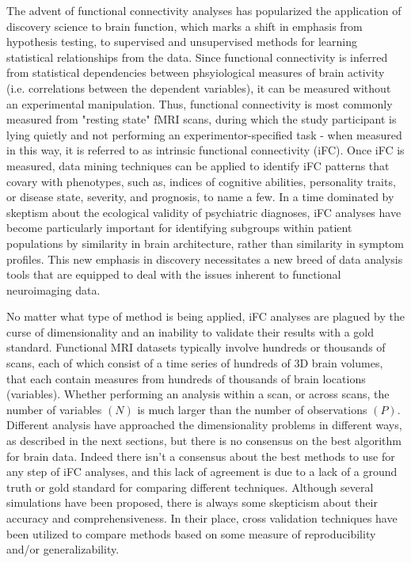 The advent of functional connectivity analyses has popularized the application of discovery science to brain function, which marks a shift in emphasis from hypothesis testing, to supervised and unsupervised methods for learning statistical relationships from the data. Since functional connectivity is inferred from statistical dependencies between phsyiological measures of brain activity (i.e. correlations between the dependent variables), it can be measured without an experimental manipulation. Thus, functional connectivity is most commonly measured from "resting state" fMRI scans, during which the study participant is lying quietly and not performing an experimentor-specified task - when measured in this way, it is referred to as intrinsic functional connectivity (iFC). Once iFC is measured, data mining techniques can be applied to identify iFC patterns that covary with phenotypes, such as, indices of cognitive abilities, personality traits, or disease state, severity, and prognosis, to name a few. In a time dominated by skeptism about the ecological validity of psychiatric diagnoses, iFC analyses have become particularly important for identifying subgroups within patient populations by similarity in brain architecture, rather than similarity in symptom profiles. This new emphasis in discovery necessitates a new breed of data analysis tools that are equipped to deal with the issues inherent to functional neuroimaging data.

No matter what type of method is being applied, iFC analyses are plagued by the curse of dimensionality and an inability to validate their results with a gold standard. Functional MRI datasets typically involve hundreds or thousands of scans, each of which consist of a time series of hundreds of 3D brain volumes, that each contain measures from hundreds of thousands of brain locations (variables). Whether performing an analysis within a scan, or across scans, the number of variables $(N)$ is much larger than the number of observations $(P)$. Different analysis have approached the dimensionality problems in different ways, as described in the next sections, but there is no consensus on the best algorithm for brain data. Indeed there isn't a consensus about the best methods to use for any step of iFC analyses, and this lack of agreement is due to a lack of a ground truth or gold standard for comparing different techniques. Although several simulations have been proposed, there is always some skepticism about their accuracy and comprehensiveness. In their place, cross validation techniques have been utilized to compare methods based on some measure of reproducibility and/or generalizability.

